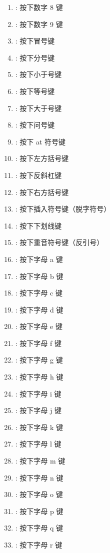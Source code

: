 \begin{enumerate}[label=\arabic*)]
    \item {}: 按下数字 8 键
    \item {}: 按下数字 9 键
    \item \codeinline{:}: 按下冒号键
    \item \codeinline{;}: 按下分号键
    \item \codeinline{<}: 按下小于号键
    \item \codeinline{=}: 按下等号键
    \item \codeinline{>}: 按下大于号键
    \item {}: 按下问号键
    \item {}: 按下 at 符号键
    \item \codeinline{[}: 按下左方括号键
    \item \codeinline{\textbackslash}: 按下反斜杠键
    \item \codeinline{]}: 按下右方括号键
    \item \codeinline{\^{}}: 按下插入符号键（脱字符号）
    \item \codeinline{\_}: 按下下划线键
    \item {}: 按下重音符号键（反引号）
    \item {}: 按下字母 a 键
    \item {}: 按下字母 b 键
    \item {}: 按下字母 c 键
    \item {}: 按下字母 d 键
    \item {}: 按下字母 e 键
    \item {}: 按下字母 f 键
    \item {}: 按下字母 g 键
    \item {}: 按下字母 h 键
    \item {}: 按下字母 i 键
    \item {}: 按下字母 j 键
    \item {}: 按下字母 k 键
    \item {}: 按下字母 l 键
    \item {}: 按下字母 m 键
    \item {}: 按下字母 n 键
    \item {}: 按下字母 o 键
    \item {}: 按下字母 p 键
    \item {}: 按下字母 q 键
    \item {}: 按下字母 r 键

\end{enumerate}
